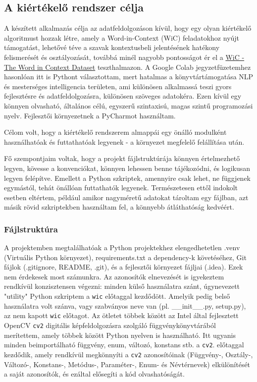 \documentclass[12pt]{report}
\theoremstyle{definition}
\begin{document}
\subsection{A kiértékelő rendszer célja}
A készített alkalmazás célja az adatfeldolgozáson kívül, hogy egy olyan kiértékelő algoritmust hozzak létre, amely a Word-in-Context (WiC) feladatokhoz nyújt támogatást, lehetővé téve a szavak kontextusbeli jelentésének hatékony felismerését és osztályozását, továbbá minél nagyobb pontosságot ér el a \href{https://pilehvar.github.io/wic/package/WiC\_dataset.zip}{WiC - The Word in Context Dataset} teszthalmazon.
A Google Colab jegyzetfüzetemhez hasonlóan itt is Pythont választottam, mert hatalmas a könyvtártámogatása NLP és mesterséges intelligencia területen, ami különösen alkalmassá  teszi gyors fejlesztésre és adatfeldolgozásra, különösen szöveges adatokéra. Ezen kívül egy könnyen olvasható, általános célú, egyszerű szintaxisú, magas szintű programozási nyelv. Fejlesztői környezetnek a  PyCharmot használtam.

Célom volt, hogy a kiértékelő rendszerem
almappái egy önálló modulként használhatóak és futtathatóak legyenek - a környezet megfelelő felállítása után.

Fő szempontjaim voltak, hogy a projekt fájlstruktúrája könnyen értelmezhető legyen, kövesse a konvenciókat, könnyen lehessen benne tájékozódni, és logikusan legyen felépítve. Emellett a Python szkriptek, amennyire csak lehet, ne függjenek egymástól, tehát önállóan futtathatók legyenek. Természetesen ettől indokolt esetben eltértem, például amikor nagyméretű adatokat tároltam egy fájlban, azt másik rövid szkriptekben használtam fel, a könnyebb átláthatóság kedvéért.

\subsubsection{Fájlstruktúra}
A projektemben megtalálhatóak a Python projektekhez elengedhetetlen .venv (Virtuális Python környezet), requirements.txt a dependency-k követéséhez, Git fájlok (.gitignore, README, .git), és a fejlesztői környezet fájljai (.idea). Ezek nem érdekesek most számunkra. Az azonosítók elnevezését is igyekeztem rendkívül konzisztensen végezni: minden külső használatra szánt, úgynevezett "utility"  Python szkriptem a \texttt{wic}  előtaggal kezdődött. Amelyik pedig belső használatra volt szánva, vagy szabványos neve van (pl. \_\_init\_\_.py, setup.py), az nem kapott \texttt{wic}  előtagot.
Az ötletet többek között az Intel által fejlesztett OpenCV \texttt{cv2} digitális képfeldolgozásra szolgáló függvénykönyvtárából merítettem, amely többek között Python nyelven is használható. Itt ugyanis minden beimportálható függvény, enum, változó, konstans stb. a \texttt{cv2}. előtaggal kezdődik, amely rendkívül megkönnyíti a \texttt{cv2} azonosítóinak (Függvény-, Osztály-, Változó-, Konstans-, Metódus-, Paraméter-, Enum- és Névtérnevek) elkülönítését a saját azonosítók, és ezáltal elősegíti a kód olvashatóságát.
\end{document}
